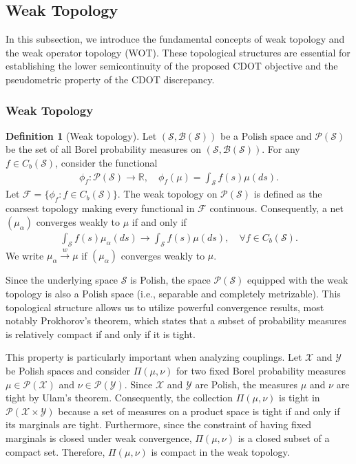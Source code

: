 \documentclass{article}
\theoremstyle{plain}
\theoremstyle{definition}
\newtheorem{definition}[theorem]{Definition}
\theoremstyle{remark}
\begin{document}
\subsection{Weak Topology}\label{App:weak-topology}
In this subsection, we introduce the fundamental concepts of weak topology and the weak operator topology (WOT). These topological structures are essential for establishing the lower semicontinuity of the proposed CDOT objective and the pseudometric property of the CDOT discrepancy.

\subsubsection{Weak Topology}
\begin{definition}[Weak topology]
	Let $(\mathcal{S},\mathcal{B}(\mathcal{S}))$ be a Polish space and $\mathcal{P}(\mathcal{S})$ be the set of all Borel probability measures on $(\mathcal{S},\mathcal{B}(\mathcal{S}))$. For any $f \in C_b(\mathcal{S})$, consider the functional
	\begin{align*}
		\phi_f : \mathcal{P}(\mathcal{S}) \to \mathbb{R}, \quad \phi_f(\mu) = \int_{\mathcal{S}} f(s)\mu(ds).
	\end{align*}
	Let $\mathcal{F} = \{\phi_f: f \in C_b(\mathcal{S})\}$. The weak topology on $\mathcal{P}(\mathcal{S})$ is defined as the coarsest topology making every functional in $\mathcal{F}$ continuous. Consequently, a net $(\mu_{\alpha})$ converges weakly to $\mu$ if and only if
	\begin{align*}
		\int_{\mathcal{S}} f(s) \mu_{\alpha}(ds) \to \int_{\mathcal{S}} f(s) \mu(ds) , \quad \forall f \in C_b(\mathcal{S}).
	\end{align*}
	We write $\mu_{\alpha} \overset{w}{\to} \mu$ if $(\mu_{\alpha})$ converges weakly to $\mu$.
\end{definition}

Since the underlying space $\mathcal{S}$ is Polish, the space $\mathcal{P}(\mathcal{S})$ equipped with the weak topology is also a Polish space (i.e., separable and completely metrizable). This topological structure allows us to utilize powerful convergence results, most notably Prokhorov's theorem, which states that a subset of probability measures is relatively compact if and only if it is tight.

This property is particularly important when analyzing couplings. Let $\mathcal{X}$ and $\mathcal{Y}$ be Polish spaces and consider $\Pi(\mu, \nu)$ for two fixed Borel probability measures $\mu \in \mathcal{P}(\mathcal{X})$ and $\nu \in \mathcal{P}(\mathcal{Y})$. Since $\mathcal{X}$ and $\mathcal{Y}$ are Polish, the measures $\mu$ and $\nu$ are tight by Ulam's theorem. Consequently, the collection $\Pi(\mu, \nu)$ is tight in $\mathcal{P}(\mathcal{X} \times \mathcal{Y})$ because a set of measures on a product space is tight if and only if its marginals are tight. Furthermore, since the constraint of having fixed marginals is closed under weak convergence, $\Pi(\mu, \nu)$ is a closed subset of a compact set. Therefore, $\Pi(\mu, \nu)$ is compact in the weak topology.
\end{document}
